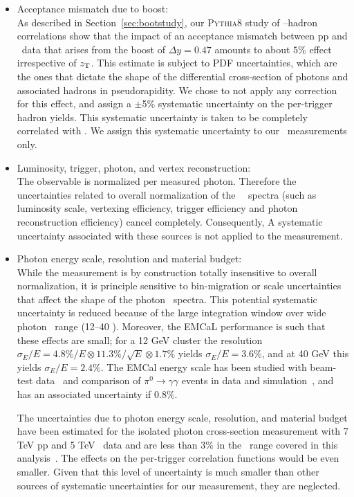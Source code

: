 \begin{itemize}
\item Acceptance mismatch due to boost:\\
As described in Section~\ref{sec:bootstudy}, our \textsc{Pythia8} study of \gammaiso--hadron correlations show that the impact of an acceptance mismatch between pp and \pPb~data that arises from the boost of $\Delta y = 0.47$ amounts to about $5\%$ effect irrespective of $z_{\mathrm{T}}$. This estimate is subject to PDF uncertainties, which are the ones that dictate the shape of the differential cross-section of photons and associated hadrons in pseudorapidity. We chose to not apply any correction for this effect, and assign a $\pm$5$\%$ systematic uncertainty on the per-trigger hadron yields. This systematic uncertainty is taken to be completely correlated with \zt. We assign this systematic uncertainty to our \pPb~measurements only. 


\item Luminosity, trigger, photon, and vertex reconstruction:\\
The observable is normalized per measured photon. Therefore the uncertainties related to overall normalization of the \gammaiso~\pt~spectra (such as luminosity scale, vertexing efficiency, trigger efficiency and photon reconstruction efficiency) cancel completely. Consequently, A systematic uncertainty associated with these sources is not applied to the measurement. 

\item Photon energy scale, resolution and material budget:\\
While the measurement is  by construction totally insensitive to overall normalization, it is principle sensitive to bin-migration or scale uncertainties that affect the shape of the photon \pt~spectra. This potential systematic uncertainty is reduced because of the large integration window over wide photon \pt~range (12--40 \GeVc). Moreover, the EMCaL performance is such that these effects are small; for a 12 GeV cluster the resolution  $\sigma_{E}/E = 4.8\%/E\otimes 11.3\%/\sqrt{E}\otimes 1.7\%$ yields $\sigma_{E}/E =3.6\%$, and at 40 GeV this yields $\sigma_{E}/E =2.4\%$. The EMCal energy scale has been studied with beam-test data~\cite{Allen:2009aa} and comparison of $\pi^{0}\to\gamma\gamma$ events in data and simulation~\cite{Adam:2016khe}, and has an associated uncertainty if 0.8$\%$. 

The uncertainties due to photon energy scale, resolution, and material budget have been estimated for the isolated photon cross-section measurement with 7 TeV pp and 5 TeV \pPb~data and are less than 3$\%$ in the \pt~range covered in this analysis~\cite{Erwann,Acharya:2019jkx}. The effects on the per-trigger correlation functions would be even smaller. Given that this level of uncertainty is much smaller than other sources of systematic uncertainties for our measurement, they are neglected. 
\end{itemize}

